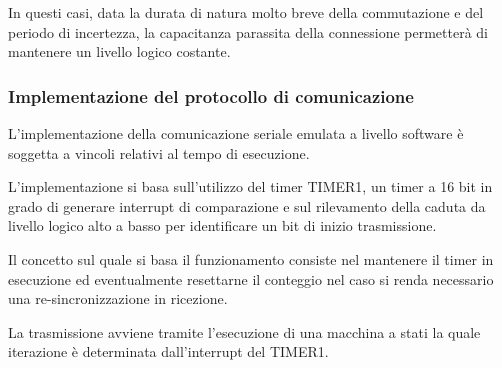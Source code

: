 In questi casi, data la durata di natura molto breve della commutazione e del periodo di incertezza, la capacitanza parassita della connessione permetterà di mantenere un livello logico costante.

\subsubsection{Implementazione del protocollo di comunicazione}

L'implementazione della comunicazione seriale emulata a livello software è soggetta a vincoli relativi al tempo di esecuzione.

L'implementazione si basa sull'utilizzo del timer TIMER1, un timer a 16 bit in grado di generare interrupt di comparazione e sul rilevamento della caduta da livello logico alto a basso per identificare un bit di inizio trasmissione.

Il concetto sul quale si basa il funzionamento consiste nel mantenere il timer in esecuzione ed eventualmente resettarne il conteggio nel caso si renda necessario una re-sincronizzazione in ricezione.

La trasmissione avviene tramite l'esecuzione di una macchina a stati la quale iterazione è determinata dall'interrupt del TIMER1.